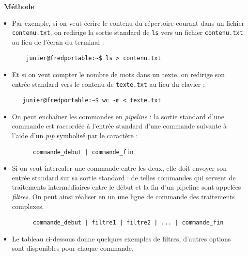 \documentclass[
  11pt,
]{article}
\newenvironment{methode}[1]
{\par \medskip    \noindent  
 \begin {bclogo}[arrondi =0.1,logo=\bcoutil, marge=4,noborder = true] {~\textbf{Méthode}   {\itshape #1} }  \par}
{
\end{bclogo}
 \par \bigskip }
\begin{document}
\begin{methode}{}
\begin{itemize}
\item
  Par exemple, si on veut écrire le contenu du répertoire courant dans
  un fichier \texttt{contenu.txt}, on redirige la sortie standard de
  \texttt{ls} vers un fichier \texttt{contenu.txt} au lieu de l'écran du
  terminal :

\begin{verbatim}
    junier@fredportable:~$ ls > contenu.txt
\end{verbatim}
\item
  Et si on veut compter le nombre de mots dans un texte, on redirige son
  entrée standard vers le contenu de \texttt{texte.txt} au lieu du
  clavier :

\begin{verbatim}
   junier@fredportable:~$ wc -m < texte.txt 
\end{verbatim}
\item
  On peut enchaîner les commandes en \emph{pipeline} : la sortie
  standard d'une commande est raccordée à l'entrée standard d'une
  commande suivante à l'aide d'un \emph{pip} symbolisé par le caractère
  \texttt{\textbar{}} :

\begin{verbatim}
      commande_debut | commande_fin
\end{verbatim}
\item
  Si on veut intercaler une commande entre les deux, elle doit envoyer
  son entrée standard sur sa sortie standard : de telles commandes qui
  servent de traitements intermédiaires entre le début et la fin d'un
  pipeline sont appelées \emph{filtres}. On peut ainsi réaliser en un
  une ligne de commande des traitements complexes.

\begin{verbatim}
      commande_debut | filtre1 | filtre2 | ... | commande_fin
\end{verbatim}
\item
  Le tableau ci-dessous donne quelques exemples de filtres, d'autres
  options sont disponibles pour chaque commande.
\end{itemize}

\end{methode}
\end{document}
